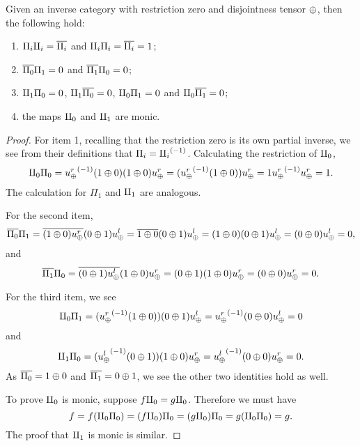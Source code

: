 \begin{lemma}\label{lem:tensor_identities}
  Given an inverse category \X with restriction zero and disjointness tensor $\oplus$, then the
  following hold:
  \begin{enumerate}
    \item $\Pi_i \amalg_{i} = \overline{\Pi_i}$ and $\amalg_{i}\Pi_i = \overline{\amalg_{i}} = 1$;
    \item $\overline{\Pi_0} \Pi_1 = 0$ and $\overline{\Pi_1} \Pi_0 = 0$;
    \item $\amalg_{1} \Pi_0 = 0$, $\amalg_{1} \overline{\Pi_0} = 0$,  $\amalg_{0} \Pi_1 = 0$ and  $\amalg_{0} \overline{\Pi_1} = 0$;
    \item the maps $\amalg_{0}$ and $\amalg_{1}$ are monic.
  \end{enumerate}
\end{lemma}
\begin{proof}
  For item 1, recalling that the restriction zero is its own partial inverse, we see from their
  definitions that $\Pi_i = {\amalg_{i}}^{(-1)}$. Calculating the restriction of $\amalg_{0}$,
  \begin{equation*}
    \amalg_{0} \Pi_0   = {u_{\oplus}^r}^{(-1)}(1\oplus0) (1\oplus0)u_{\oplus}^r
      = ({u_{\oplus}^r}^{(-1)}(1\oplus0))u_{\oplus}^r = 1 {u_{\oplus}^r}^{(-1)}u_{\oplus}^r= 1.
  \end{equation*}
  The calculation for $\Pi_1$ and $\amalg_{1}$ are analogous.

  For the second item,
  \[
    \overline{\Pi_0} \Pi_1  = \overline{(1\oplus0)u_{\oplus}^r}(0\oplus1)u_{\oplus}^l  = \overline{1\oplus0} (0 \oplus 1)u_{\oplus}^l
     = (1\oplus0) (0\oplus1)u_{\oplus}^l
      = (0\oplus0)u_{\oplus}^l  = 0,
  \]
  and
  \[
    \overline{\Pi_1} \Pi_0  = \overline{(0\oplus1)u_{\oplus}^l}(1\oplus0)u_{\oplus}^r
     = (0\oplus1) (1\oplus0)u_{\oplus}^r
     = (0\oplus0)u_{\oplus}^r
     = 0.
 \]

  For the third item, we see
  \[
    \amalg_{0} \Pi_1 = ({u_{\oplus}^r}^{(-1)}(1\oplus0))(0\oplus1) u_{\oplus}^l
       = {u_{\oplus}^r}^{(-1)}(0\oplus0)u_{\oplus}^l\\
       = 0
  \]
  and
  \[
    \amalg_{1} \Pi_0 = ({u_{\oplus}^l}^{(-1)}(0\oplus1))(1\oplus0) u_{\oplus}^r
       = {u_{\oplus}^l}^{(-1)}(0\oplus0)u_{\oplus}^r
       = 0.
  \]
  As $\overline{\Pi_0} = 1\oplus0$ and $\overline{\Pi_1} = 0 \oplus1$, we see the other two identities hold as well.

  To prove $\amalg_{0}$ is monic, suppose $f\amalg_{0} = g\amalg_{0}$. Therefore we must have
  \[
    f = f (\amalg_{0} \Pi_0) = (f \amalg_{0}) \Pi_0 = (g \amalg_{0}) \Pi_0 = g (\amalg_{0} \Pi_0) = g.
  \]
  The proof that $\amalg_{1}$ is monic is similar.
\end{proof}
